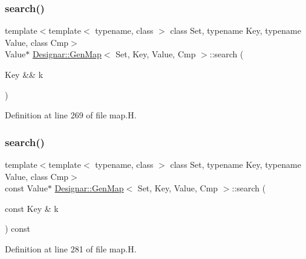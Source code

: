 \subsubsection{\texorpdfstring{search()}{search()}\hspace{0.1cm}{\footnotesize\ttfamily [2/4]}}
{\footnotesize\ttfamily template$<$template$<$ typename, class $>$ class Set, typename Key, typename Value, class Cmp$>$ \\
Value$\ast$ \hyperlink{class_designar_1_1_gen_map}{Designar\+::\+Gen\+Map}$<$ Set, Key, Value, Cmp $>$\+::search (\begin{DoxyParamCaption}\item[{Key \&\&}]{k }\end{DoxyParamCaption})\hspace{0.3cm}{\ttfamily [inline]}}



Definition at line 269 of file map.\+H.

\mbox{\label{class_designar_1_1_gen_map_a39037bc9d24b92fdcc7a6289db00e59b}} 
\subsubsection{\texorpdfstring{search()}{search()}\hspace{0.1cm}{\footnotesize\ttfamily [3/4]}}
{\footnotesize\ttfamily template$<$template$<$ typename, class $>$ class Set, typename Key, typename Value, class Cmp$>$ \\
const Value$\ast$ \hyperlink{class_designar_1_1_gen_map}{Designar\+::\+Gen\+Map}$<$ Set, Key, Value, Cmp $>$\+::search (\begin{DoxyParamCaption}\item[{const Key \&}]{k }\end{DoxyParamCaption}) const\hspace{0.3cm}{\ttfamily [inline]}}



Definition at line 281 of file map.\+H.

\mbox{\label{class_designar_1_1_gen_map_a00517c31638c479dca955b9204a2275e}} 
